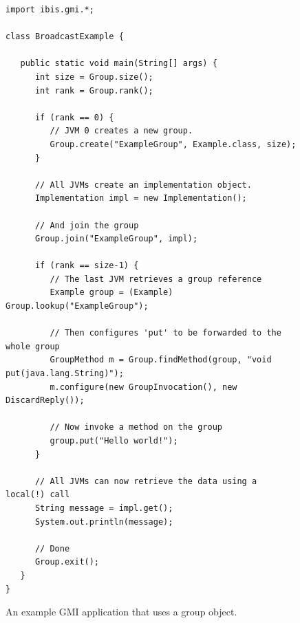 \documentclass[10pt]{article}
\begin{document}
\begin{figure}[t!]
{\small
\begin{verbatim}
import ibis.gmi.*;

class BroadcastExample {

   public static void main(String[] args) {
      int size = Group.size();
      int rank = Group.rank();

      if (rank == 0) {
         // JVM 0 creates a new group. 
         Group.create("ExampleGroup", Example.class, size);
      } 

      // All JVMs create an implementation object.
      Implementation impl = new Implementation();
   
      // And join the group
      Group.join("ExampleGroup", impl);

      if (rank == size-1) { 
         // The last JVM retrieves a group reference
         Example group = (Example) Group.lookup("ExampleGroup");

         // Then configures 'put' to be forwarded to the whole group
         GroupMethod m = Group.findMethod(group, "void put(java.lang.String)");
         m.configure(new GroupInvocation(), new DiscardReply());

         // Now invoke a method on the group
         group.put("Hello world!");
      } 

      // All JVMs can now retrieve the data using a local(!) call
      String message = impl.get();        
      System.out.println(message);

      // Done   
      Group.exit();
   }
} 
\end{verbatim}
}
\caption{An example GMI application that uses a group object.}
\label{gmi-2}
\end{figure}
\end{document}
